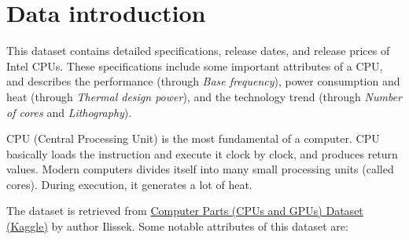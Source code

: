 \section{Data introduction}

This dataset contains detailed specifications, release dates, and release prices of Intel CPUs. These specifications include some important attributes of a CPU,
and describes the performance (through \textit{Base frequency}), power consumption and heat (through \textit{Thermal design power}), and the technology trend (through
\textit{Number of cores} and \textit{Lithography}).

CPU (Central Processing Unit) is the most fundamental of a computer. CPU basically loads the instruction and execute it clock by clock, and produces return values.
Modern computers divides itself into many small processing units (called cores). During execution, it generates a lot of heat.

The dataset is retrieved from \href{https://www.kaggle.com/datasets/iliassekkaf/computerparts?select=Intel_CPUs.csv}{Computer Parts (CPUs and GPUs) Dataset (Kaggle)} 
by author Ilissek. Some notable attributes of this dataset are:

\renewcommand{\arraystretch}{1.5}

